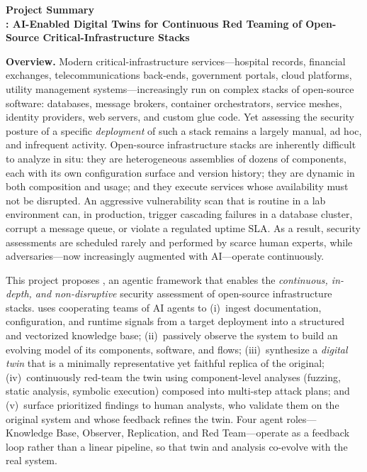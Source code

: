 
\begin{center}
  {\large\bfseries Project Summary}\\[0.3em]
  {\large\bfseries \sysname: AI-Enabled Digital Twins for Continuous Red Teaming of Open-Source Critical-Infrastructure Stacks}
\end{center}

\noindent\textbf{Overview.}
Modern critical-infrastructure services---hospital records, financial
exchanges, telecommunications back-ends, government portals, cloud
platforms, utility management systems---increasingly run on complex
stacks of open-source software: databases, message brokers, container
orchestrators, service meshes, identity providers, web servers, and
custom glue code. Yet assessing the security posture of a specific
\emph{deployment} of such a stack remains a largely manual, ad hoc, and
infrequent activity.
Open-source infrastructure stacks are inherently difficult to analyze
in situ: they are heterogeneous assemblies of dozens of components,
each with its own configuration surface and version history; they are
dynamic in both composition and usage; and they execute services whose
availability must not be disrupted. An aggressive vulnerability scan
that is routine in a lab environment can, in production, trigger
cascading failures in a database cluster, corrupt a message queue, or
violate a regulated uptime SLA. As a result, security assessments are
scheduled rarely and performed by scarce human experts, while
adversaries---now increasingly augmented with AI---operate continuously.

This project proposes \sysname, an agentic framework that enables the
\emph{continuous, in-depth, and non-disruptive} security assessment of
open-source infrastructure stacks. \sysname uses cooperating teams of
AI agents to
(i)~ingest documentation, configuration, and runtime signals from a
target deployment into a structured and vectorized knowledge base;
(ii)~passively observe the system to build an evolving model of its
components, software, and flows; (iii)~synthesize a \emph{digital twin}
that is a minimally representative yet faithful replica of the original;
(iv)~continuously red-team the twin using component-level analyses
(fuzzing, static analysis, symbolic execution) composed into multi-step
attack plans; and (v)~surface prioritized findings to human analysts,
who validate them on the original system and whose feedback refines
the twin. Four agent roles---Knowledge Base, Observer, Replication,
and Red Team---operate as a feedback loop rather than a linear
pipeline, so that twin and analysis co-evolve with the real system.

